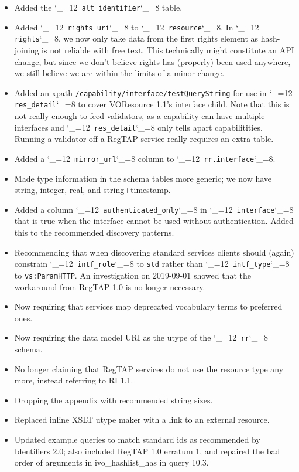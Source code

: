 \documentclass[11pt,a4paper]{ivoa}
\makeatletter
\def\rtent#1{\texttt{\color{rtcolor}\verb|#1|}}
\def\makeunderscoreletter{\catcode`\_=12}
\def\makeunderscoresubscript{\catcode`\_=8}
\def\rtent{\makeunderscoreletter\relax\rt@nt}
\def\rt@nt#1{\texttt{\color{rtcolor} #1}\makeunderscoresubscript{}}
\makeatother
\begin{document}
\begin{itemize}
\item Added the \rtent{alt_identifier} table.
\item Added \rtent{rights_uri} to \rtent{resource}.
In \rtent{rights}, we now only take data from the first rights element
as hash-joining is not reliable with free text.
This technically might constitute an API change, but since we don't
believe rights has (properly) been used anywhere, we still believe we are
within the limits of a minor change.
\item Added an xpath \texttt{/capability/interface/testQueryString} for
use in
\rtent{res_detail} to cover VOResource 1.1's 
interface child.  Note that this is not really enough to feed
validators, as a capability can have multiple interfaces and
\rtent{res_detail} only tells apart capabilitities.  Running a
validator off a RegTAP service really requires an extra table.
\item Added a \rtent{mirror_url} column to \rtent{rr.interface}.
\item Made type information in the schema tables more generic; we now
have string, integer, real, and string+timestamp.
\item Added a column \rtent{authenticated_only} in \rtent{interface}
that is true when the interface cannot be used without authentication.
Added this to the recommended discovery patterns.
\item Recommending that when discovering standard services clients
should (again) constrain \rtent{intf_role} to \verb|std| rather than
\rtent{intf_type} to \verb|vs:ParamHTTP|.  An investigation on 2019-09-01 showed that the
workaround from RegTAP 1.0 is no longer necessary.
\item Now requiring that services map deprecated vocabulary terms to
preferred ones.
\item Now requiring the data model URI as the utype of the \rtent{rr} schema.
\item No longer claiming that RegTAP services do not use the
 resource type any more, instead referring to RI 1.1.
\item Dropping the appendix with recommended string sizes.
\item Replaced inline XSLT utype maker with a link to an external
resource.
\item Updated example queries to match standard ids as recommended by
Identifiers 2.0; also included RegTAP 1.0 erratum 1, and repaired the
bad order of arguments in ivo\_hashlist\_has in query 10.3.
\end{itemize}
\end{document}

